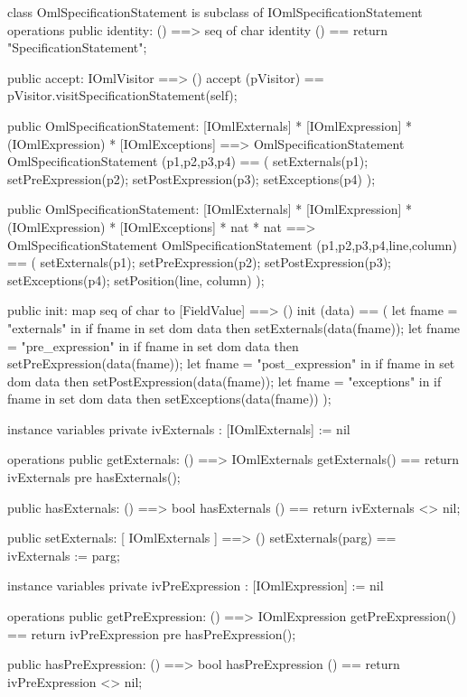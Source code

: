 \begin{vdm_al}
class OmlSpecificationStatement is subclass of IOmlSpecificationStatement
operations
  public identity: () ==> seq of char
  identity () == return "SpecificationStatement";

  public accept: IOmlVisitor ==> ()
  accept (pVisitor) == pVisitor.visitSpecificationStatement(self);

  public OmlSpecificationStatement:
    [IOmlExternals] *
    [IOmlExpression] *
    (IOmlExpression) *
    [IOmlExceptions] ==> OmlSpecificationStatement
  OmlSpecificationStatement (p1,p2,p3,p4) == 
    ( setExternals(p1);
      setPreExpression(p2);
      setPostExpression(p3);
      setExceptions(p4) );

  public OmlSpecificationStatement:
    [IOmlExternals] *
    [IOmlExpression] *
    (IOmlExpression) *
    [IOmlExceptions] *
    nat *
    nat ==> OmlSpecificationStatement
  OmlSpecificationStatement (p1,p2,p3,p4,line,column) == 
    ( setExternals(p1);
      setPreExpression(p2);
      setPostExpression(p3);
      setExceptions(p4);
      setPosition(line, column) );

  public init: map seq of char to [FieldValue] ==> ()
  init (data) ==
    ( let fname = "externals" in
        if fname in set dom data
        then setExternals(data(fname));
      let fname = "pre_expression" in
        if fname in set dom data
        then setPreExpression(data(fname));
      let fname = "post_expression" in
        if fname in set dom data
        then setPostExpression(data(fname));
      let fname = "exceptions" in
        if fname in set dom data
        then setExceptions(data(fname)) );

instance variables
  private ivExternals : [IOmlExternals] := nil

operations
  public getExternals: () ==> IOmlExternals
  getExternals() == return ivExternals
    pre hasExternals();

  public hasExternals: () ==> bool
  hasExternals () == return ivExternals <> nil;

  public setExternals: [ IOmlExternals ] ==> ()
  setExternals(parg) == ivExternals := parg;

instance variables
  private ivPreExpression : [IOmlExpression] := nil

operations
  public getPreExpression: () ==> IOmlExpression
  getPreExpression() == return ivPreExpression
    pre hasPreExpression();

  public hasPreExpression: () ==> bool
  hasPreExpression () == return ivPreExpression <> nil;


\end{vdm_al}
